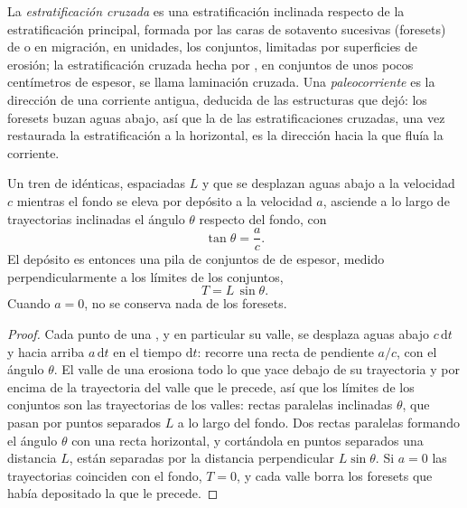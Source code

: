 \begin{definition}\label{def:b1:clastic-sediments:cross-bedding}
La \emph{estratificación cruzada} es una estratificación inclinada respecto de la estratificación principal, formada por las caras de
sotavento sucesivas (foresets) de  o  en migración, en unidades, los conjuntos, limitadas por superficies de erosión; la estratificación cruzada hecha por ,
en conjuntos de unos pocos centímetros de espesor, se llama laminación cruzada. Una \emph{paleocorriente} es la dirección de una corriente antigua,
deducida de las estructuras que dejó: los foresets buzan aguas abajo, así que la  de las estratificaciones cruzadas, una vez restaurada la estratificación
a la horizontal, es la dirección hacia la que fluía la corriente.
\end{definition}

\begin{proposition}\label{prop:b1:clastic-sediments:climb}
Un tren de  idénticas, espaciadas $L$ y que se desplazan aguas abajo a la velocidad $c$ mientras el fondo se eleva por depósito a la velocidad $a$, asciende
a lo largo de trayectorias inclinadas el ángulo $\theta$ respecto del fondo, con
\[
  \tan\theta = \frac{a}{c}.
\]
El depósito es entonces una pila de conjuntos de  de espesor, medido perpendicularmente a los límites de los conjuntos,
\[
  T = L\,\sin\theta .
\]
Cuando $a = 0$, no se conserva nada de los foresets.
\end{proposition}

\begin{proof}
Cada punto de una , y en particular su valle, se desplaza aguas abajo $c\,\mathrm dt$ y hacia arriba $a\,\mathrm dt$ en el tiempo $\mathrm dt$: recorre una
recta de pendiente $a/c$, con el ángulo $\theta$. El valle de una  erosiona todo lo que yace debajo de su trayectoria y por encima de la trayectoria del valle
que le precede, así que los límites de los conjuntos son las trayectorias de los valles: rectas paralelas inclinadas $\theta$, que pasan por puntos separados $L$ a lo largo del
fondo. Dos rectas paralelas formando el ángulo $\theta$ con una recta horizontal, y cortándola en puntos separados una distancia $L$, están separadas por la distancia perpendicular
$L\sin\theta$. Si $a = 0$ las trayectorias coinciden con el fondo, $T = 0$, y cada valle borra los foresets que había depositado la  que le precede.
\end{proof}

